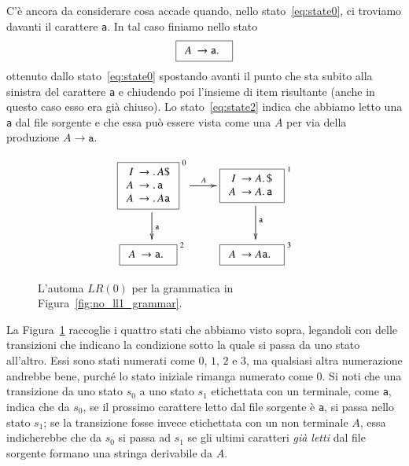 C'\`e ancora da considerare cosa accade quando, nello stato~\eqref{eq:state0},
ci troviamo davanti il carattere \texttt{a}. In tal caso finiamo nello stato
\begin{equation}\label{eq:state2}
  \fbox{$
  \begin{array}{rl}
     A \!\!\!& \to\mathtt{a}.\,
  \end{array}$
  }
\end{equation}
ottenuto dallo
stato~\eqref{eq:state0} spostando avanti il punto che sta subito alla sinistra
del carattere \texttt{a} e chiudendo poi l'insieme di item risultante
(anche in questo caso esso era gi\`a chiuso).
Lo stato~\eqref{eq:state2} indica che abbiamo
letto una \texttt{a} dal file sorgente e che essa
pu\`o essere vista come una $A$ per via della produzione $A\to\mathtt{a}$.
%
\begin{figure}[t]
\[
\xymatrix{
  \fbox{$
  \begin{array}{rl}
     I \!\!\!& \to\idot A\mathtt{\$}\\
     A \!\!\!& \to\idot\mathtt{a}\\
     A \!\!\!& \to\idot A\mathtt{a}
  \end{array}$}^{\ 0}
  \ar[r]^A\ar[d]^(.6){\mathtt{a}}
  &
  \fbox{$
  \begin{array}{rl}
     I \!\!\!& \to A\idot\mathtt{\$}\\
     A \!\!\!& \to A\idot\mathtt{a}
  \end{array}$
  }^{\ 1}\ar[d]^{\mathtt{a}}\\
  \fbox{$
  \begin{array}{rl}
     A \!\!\!& \to\mathtt{a}\idot
  \end{array}$
  }^{\ 2}
  &
  \fbox{$
  \begin{array}{rl}
     A \!\!\!& \to A\mathtt{a}\idot
  \end{array}$
  }^{\ 3}
}
\]
\caption{L'automa $\mathit{LR}(0)$ per la grammatica in
         Figura~\ref{fig:no_ll1_grammar}.}\label{fig:lr0_automaton}
\end{figure}

La Figura~\ref{fig:lr0_automaton} raccoglie i quattro stati che abbiamo
visto sopra, legandoli con delle transizioni che indicano la condizione
sotto la quale si passa da uno stato all'altro. Essi sono stati
numerati come $0$, $1$, $2$ e $3$, ma qualsiasi altra numerazione andrebbe
bene, purch\'e lo stato iniziale rimanga numerato come $0$.
Si noti che una transizione da uno stato $s_0$ a uno stato $s_1$
etichettata con un terminale, come
\texttt{a}, indica che da $s_0$, se il prossimo carattere letto
dal file sorgente \`e \texttt{a}, si passa nello stato $s_1$;
se la transizione fosse invece etichettata con un non terminale $A$, essa
indicherebbe
che da $s_0$ si passa ad $s_1$ se gli ultimi caratteri \emph{gi\`a letti} dal
file sorgente formano una stringa derivabile da $A$.

